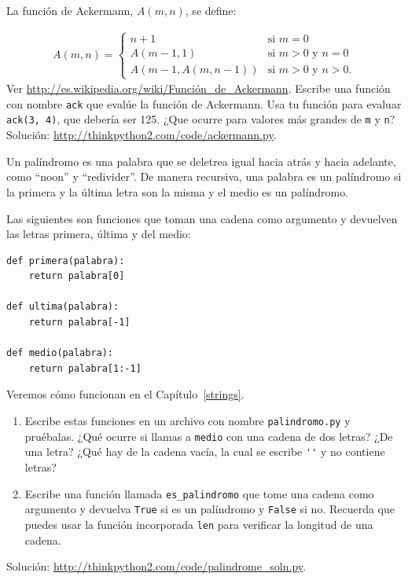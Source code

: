 \documentclass[10pt]{book}
\begin{document}
\begin{exercise}
\label{ackermann}

La función de Ackermann, $A(m, n)$, se define:

\begin{eqnarray*}
A(m, n) = \begin{cases}
              n+1 & \mbox{si } m = 0 \\
        A(m-1, 1) & \mbox{si } m > 0 \mbox{ y } n = 0 \\
A(m-1, A(m, n-1)) & \mbox{si } m > 0 \mbox{ y } n > 0.
\end{cases}
\end{eqnarray*}
%
Ver \url{http://es.wikipedia.org/wiki/Función_de_Ackermann}.
Escribe una función con nombre {\tt ack} que evalúe la función de Ackermann.
Usa tu función para evaluar {\tt ack(3, 4)}, que debería ser 125.
¿Que ocurre para valores más grandes de {\tt m} y {\tt n}?
Solución: \url{http://thinkpython2.com/code/ackermann.py}.

\end{exercise}


\begin{exercise}
\label{palindrome}

Un palíndromo es una palabra que se deletrea igual hacia atrás y
hacia adelante, como ``noon'' y ``redivider''.  De manera recursiva, una palabra
es un palíndromo si la primera y la última letra son la misma
y el medio es un palíndromo.

Las siguientes son funciones que toman una cadena como argumento y
devuelven las letras primera, última y del medio:

\begin{verbatim}
def primera(palabra):
    return palabra[0]

def ultima(palabra):
    return palabra[-1]

def medio(palabra):
    return palabra[1:-1]
\end{verbatim}
%
Veremos cómo funcionan en el Capítulo~\ref{strings}.

\begin{enumerate}

\item Escribe estas funciones en un archivo con nombre {\tt palindromo.py}
y pruébalas.  ¿Qué ocurre si llamas a {\tt medio} con
una cadena de dos letras?  ¿De una letra?  ¿Qué hay de la cadena
vacía, la cual se escribe \verb"''" y no contiene letras?

\item Escribe una función llamada \verb"es_palindromo" que tome
una cadena como argumento y devuelva {\tt True} si es un palíndromo
y {\tt False} si no.  Recuerda que puedes usar la
función incorporada {\tt len} para verificar la longitud de una cadena.

\end{enumerate}

Solución: \url{http://thinkpython2.com/code/palindrome_soln.py}.

\end{exercise}
\end{document}
